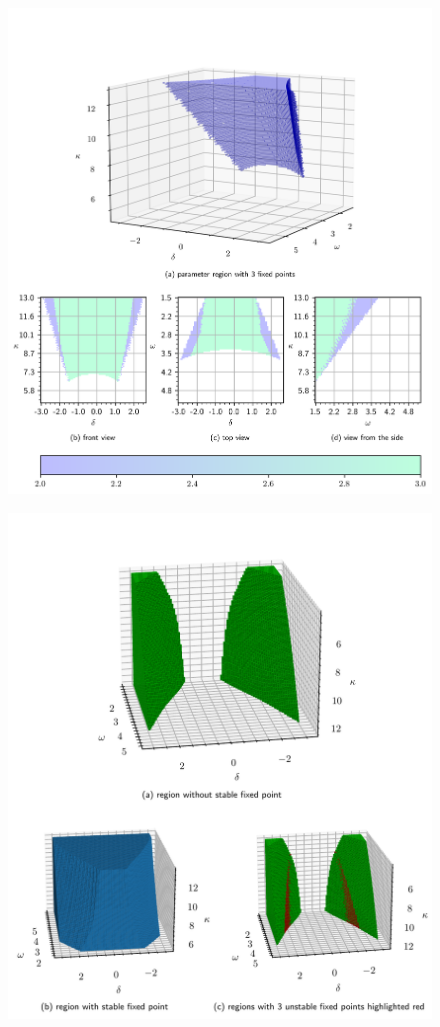 \documentclass{article}
\begin{document}
\begin{figure}[H]
    \vspace{-0.35cm}
    \hspace*{-1.3cm}
    \includegraphics{pictures/numb_of_fixp_extended.png}
\end{figure}
\begin{figure}[H]
    \vspace{-0.35cm}
    \hspace*{-1.3cm}
    \includegraphics{pictures/stability_regions_extended.pdf}
\end{figure}
\end{document}
